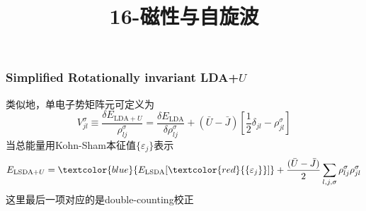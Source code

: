 \frame
{
	\frametitle{\textrm{Simplified Rotationally invariant LDA+}$U$}
	类似地，单电子势矩阵元可定义为
	\begin{displaymath}
		V_{jl}^{\sigma}\equiv\frac{\delta E_{\mathrm{LDA+}U}}{\rho_{lj}^{\sigma}}=\frac{\delta E_{\mathrm{LDA}}}{\delta \rho_{lj}^{\sigma}}+(\bar U-\bar J)\left[\frac12\delta_{jl}-\rho_{jl}^{\sigma}\right]
	\end{displaymath}
	当总能量用\textrm{Kohn-Sham}本征值$\{\varepsilon_j\}$表示
	\begin{displaymath}
		E_{\textrm{LSDA+}U}=\textcolor{blue}{E_{\textrm{LSDA}}[\textcolor{red}{\{\varepsilon_j\}}]}+\frac{(\bar U-\bar J)}2\sum_{l,j,\sigma}\rho_{lj}^{\sigma}\rho_{jl}^{\sigma}
	\end{displaymath}
	这里最后一项对应的是\textrm{double-counting}校正
}

\title{16-磁性与自旋波}
